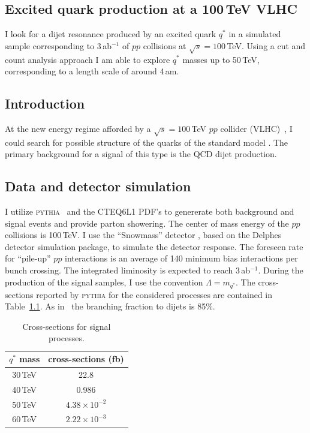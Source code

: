 \begin{boldmath}
\chapter{Excited quark production at a 100\,TeV VLHC}
\label{chap:VLHC_Qstar}
\end{boldmath}



I look for a dijet resonance produced by an excited quark $q^*$
in a simulated sample corresponding to 3\,ab$^{-1}$ of $pp$ collisions
at $\sqrt{s} = 100$\,TeV.  Using a cut and count analysis approach I
am able to explore $q^*$ masses up to 50\,TeV, corresponding to a
length scale of around 4\,am.

\section{Introduction}

At the new energy regime afforded by a $\sqrt{s} =100$\,TeV $pp$
collider (VLHC)~\cite{Ambrosio:2001ej}, I could search for possible
structure of the quarks of the standard model \cite{Baur:1989kv,
  Baur:1987ga, Harris:1996ct}.  The primary background for a signal of
this type is the QCD dijet production.

\section{Data and detector simulation}

I utilize \textsc{pythia}~\cite{Sjostrand:2006za} and the CTEQ6L1
PDF's to genererate both background and signal events and provide
parton showering.  The center of mass energy of the $pp$ collisions is
100\,TeV.  I use the ``Snowmass'' detector%
, based on
the Delphes~\cite{Delphes} detector simulation package, to simulate
the detector response.  The foreseen rate for ``pile-up'' $pp$
interactions is an average of 140 minimum bias interactions per bunch
crossing.  The integrated liminosity is expected to reach
3\,ab$^{-1}$.  During the production of the signal samples, I use the
convention $\Lambda = m_{q^*}$.  The cross-sections reported by
\textsc{pythia} for the considered processes are contained in
Table~\ref{tab:qstar_xsec}.  As in~\cite{Baur:1989kv} the branching
fraction to dijets is 85\%.  

\begin{table}
\caption{\label{tab:qstar_xsec} Cross-sections for signal processes.}
\begin{center}
\begin{tabular}{|c|c|}
\hline
$q^*$ mass & cross-sections (fb) \\
\hline
30\,TeV & 22.8 \\
40\,TeV & 0.986 \\
50\,TeV & $4.38\times 10^{-2}$ \\
60\,TeV & $2.22\times 10^{-3}$ \\
\hline
\end{tabular}
\end{center}
\end{table}

